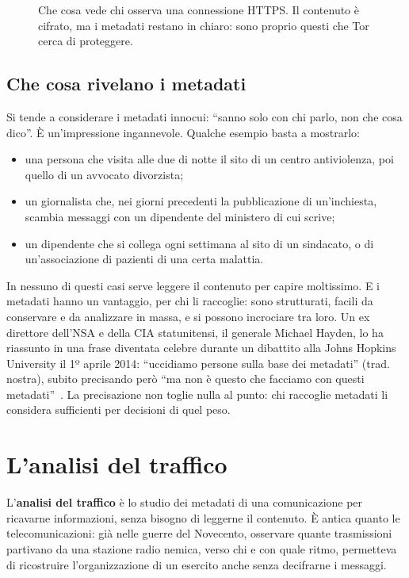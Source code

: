 \begin{figure}[htbp]
\centering

\caption{Che cosa vede chi osserva una connessione HTTPS. Il contenuto è cifrato, ma i metadati restano in chiaro: sono proprio questi che Tor cerca di proteggere.}
\label{fig:metadati}
\end{figure}

\subsection{Che cosa rivelano i metadati}

Si tende a considerare i metadati innocui: \enquote{sanno solo con chi parlo, non che cosa dico}. È un'impressione ingannevole. Qualche esempio basta a mostrarlo:
\begin{itemize}
  \item una persona che visita alle due di notte il sito di un centro antiviolenza, poi quello di un avvocato divorzista;
  \item un giornalista che, nei giorni precedenti la pubblicazione di un'inchiesta, scambia messaggi con un dipendente del ministero di cui scrive;
  \item un dipendente che si collega ogni settimana al sito di un sindacato, o di un'associazione di pazienti di una certa malattia.
\end{itemize}
In nessuno di questi casi serve leggere il contenuto per capire moltissimo. E i metadati hanno un vantaggio, per chi li raccoglie: sono strutturati, facili da conservare e da analizzare in massa, e si possono incrociare tra loro. Un ex direttore dell'NSA e della CIA statunitensi, il generale Michael Hayden, lo ha riassunto in una frase diventata celebre durante un dibattito alla Johns Hopkins University il 1º aprile 2014: \enquote{uccidiamo persone sulla base dei metadati} (trad. nostra), subito precisando però \enquote{ma non è questo che facciamo con questi metadati}~\cite{hayden2014metadata}. La precisazione non toglie nulla al punto: chi raccoglie metadati li considera sufficienti per decisioni di quel peso.

\section{L'analisi del traffico}\label{sec:anon-traffico}

L'\textbf{analisi del traffico} è lo studio dei metadati di una comunicazione per ricavarne informazioni, senza bisogno di leggerne il contenuto. È antica quanto le telecomunicazioni: già nelle guerre del Novecento, osservare quante trasmissioni partivano da una stazione radio nemica, verso chi e con quale ritmo, permetteva di ricostruire l'organizzazione di un esercito anche senza decifrarne i messaggi.

